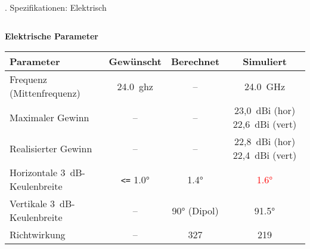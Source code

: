 \documentclass[
  aspectratio=169, %
]{beamer}
\begin{document}

\begin{frame}{\thesection. Spezifikationen: Elektrisch}
\begin{columns}[T]
  
  \begin{column}{0.7\textwidth}
    \centering
    \scriptsize
    \textbf{Elektrische Parameter}
    \vspace{1mm}

    \begin{tabular}{|l|c|c|c|}
      \hline
      \textbf{Parameter} & \textbf{Gewünscht} & \textbf{Berechnet} & \textbf{Simuliert} \\
      \hline
      Frequenz (Mittenfrequenz) & 24.0~\gls*{ghz} & – & 24.0~GHz \\
\hline
Maximaler Gewinn & – & – & 23{,}0~dBi (hor) \textbar{} 22{,}6~dBi (vert) \\
\hline
Realisierter Gewinn & – & – & 22{,}8~dBi (hor) \textbar{} 22{,}4~dBi (vert) \\
\hline

      Horizontale 3~dB-Keulenbreite & \texttt{<=} 1.0° & 1.4° & \textcolor{red}{1.6°} \\
      \hline
      Vertikale 3~dB-Keulenbreite & – & 90° (Dipol) & 91.5° \\
      \hline
      Richtwirkung & – & 327 & 219 \\
      \hline
    \end{tabular}
  \end{column}
\end{columns}

\end{frame}
\end{document}
